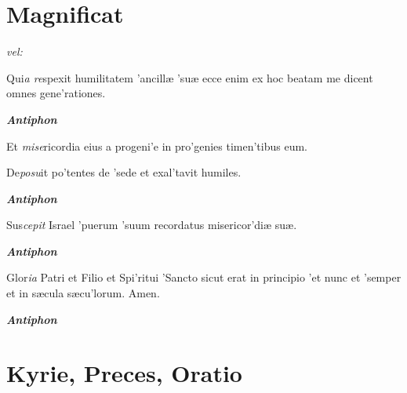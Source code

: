 \section*{Magnificat}
\par
\textit{vel:}\par
{}
\par\vskip9bp
\begin{multicols}{2}\setlength{\columnseprule}{0.2px}
Qui\textit{a re}spexit humilitatem 'ancillæ 'suæ \grestar{} ecce enim ex hoc beatam me dicent omnes gene'rationes.\par
{}\par
\textit{\textbf{Antiphon}}\par
Et \textit{mise}ricordia eius a progeni'e in pro'genies \grestar{} timen'tibus eum.\par
{}\par
De\textit{posu}it po'tentes de 'sede \grestar{} et exal'tavit humiles.\par
\textit{\textbf{Antiphon}}\par
{}\par
Sus\textit{cepit} Israel 'puerum 'suum \grestar{} recordatus misericor'diæ suæ.\par
{}\par
\textit{\textbf{Antiphon}}\par
Glor\textit{ia} Patri et Filio et Spi'ritui 'Sancto \grestar{} sicut erat in principio 'et nunc et 'semper \grestar{} et in sæcula sæcu'lorum. Amen.\par
\textit{\textbf{Antiphon}}\par
\end{multicols}
\vskip3bp
\section*{Kyrie, Preces, Oratio}
\par
{}\par
{}\par
{}\par
